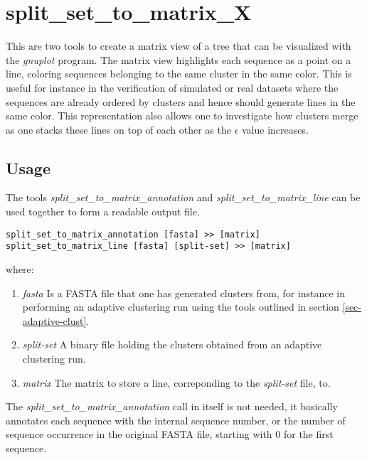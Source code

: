 \section{split\_set\_to\_matrix\_X}

This are two tools to create a matrix view of a tree that can be
visualized with the \emph{gnuplot} \cite{gnuplot} program. The matrix
view highlights each sequence as a point on a line,
coloring sequences belonging to the same cluster in the same
color. This is useful for instance in the verification of simulated or
real datasets where the sequences are already ordered by clusters and
hence should generate lines in the same color.
This representation also allows one to investigate how clusters merge as one
stacks these lines on top of each other as the $\epsilon$ value increases.

\subsection{Usage}

The tools \emph{split\_set\_to\_matrix\_annotation} and
\emph{split\_set\_to\_matrix\_line} can be used together to form a
readable output file. 

\begin{lstlisting}
split_set_to_matrix_annotation [fasta] >> [matrix]
split_set_to_matrix_line [fasta] [split-set] >> [matrix]
\end{lstlisting}
where:
\begin{enumerate}
  \item \emph{fasta} Is a FASTA file that one has generated clusters
    from, for instance in performing an adaptive clustering run using the
    tools outlined in section \ref{sec-adaptive-clust}.
  \item \emph{split-set} A binary file holding the clusters obtained
    from an adaptive clustering run.
  \item \emph{matrix} The matrix to store a line,
    correponding to the \emph{split-set} file, to.
\end{enumerate}
The \emph{split\_set\_to\_matrix\_annotation} call in itself is not
needed, it basically annotates each sequence with the internal
sequence number, or the number of sequence occurrence in the original
FASTA file, starting with 0 for the first sequence.

